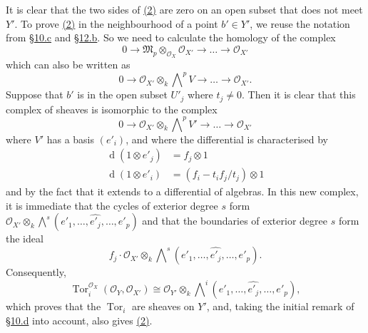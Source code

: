 \documentclass{article}
\theoremstyle{plain}
\theoremstyle{definition}
\newcommand{\scr}[1]{{\mathscr{#1}}}
\newcommand{\dd}{\operatorname{d}\!}
\DeclareMathOperator{\Tor}{Tor}
\begin{document}
It is clear that the two sides of \hyperref[section15equation2]{(2)} are zero on an open subset that does not meet $Y'$.
To prove \hyperref[section15equation2]{(2)} in the neighbourhood of a point $b'\in Y'$, we reuse the notation from \hyperref[subsection10c]{\S10.c} and \hyperref[subsection12b]{\S12.b}.
So we need to calculate the homology of the complex
\[
  0 \to \mathfrak{M}_p\otimes_{\scr{O}_X}\scr{O}_{X'} \to \ldots \to \scr{O}_{X'}
\]
which can also be written as
\[
  0 \to \scr{O}_{X'}\otimes_k\bigwedge\nolimits^p V \to \ldots \to \scr{O}_{X'}.
\]
Suppose that $b'$ is in the open subset $U'_j$ where $t_j\neq0$.
Then it is clear that this complex of sheaves is isomorphic to the complex
\[
  0 \to \scr{O}_{X'}\otimes_k\bigwedge\nolimits^p V' \to \ldots \to \scr{O}_{X'}
\]
where $V'$ has a basis $(e'_i)$, and where the differential is characterised by
\begin{align*}
  \dd(1\otimes e'_j) &= f_j\otimes1
\\\dd(1\otimes e'_i) &= (f_i-t_if_j/t_j)\otimes1
\end{align*}
and by the fact that it extends to a differential of algebras.
In this new complex, it is immediate that the cycles of exterior degree $s$ form $\scr{O}_{X'}\otimes_k\bigwedge\nolimits^s(e'_1,\ldots,\widehat{e'_j},\ldots,e'_p)$ and that the boundaries of exterior degree $s$ form the ideal
\[
  f_j\cdot\scr{O}_{X'}\otimes_k\bigwedge\nolimits^s(e'_1,\ldots,\widehat{e'_j},\ldots,e'_p).
\]
Consequently,
\[
  \Tor_i^{\scr{O}_X}(\scr{O}_Y,\scr{O}_{X'})
  \cong
  \scr{O}_{Y'}\otimes_k\bigwedge\nolimits^i(e'_1,\ldots,\widehat{e'_j},\ldots,e'_p),
\]
which proves that the $\Tor_i$ are sheaves on $Y'$, and, taking the initial remark of \hyperref[subsection10d]{\S10.d} into account, also gives \hyperref[section15equation2]{(2)}.
\end{document}
